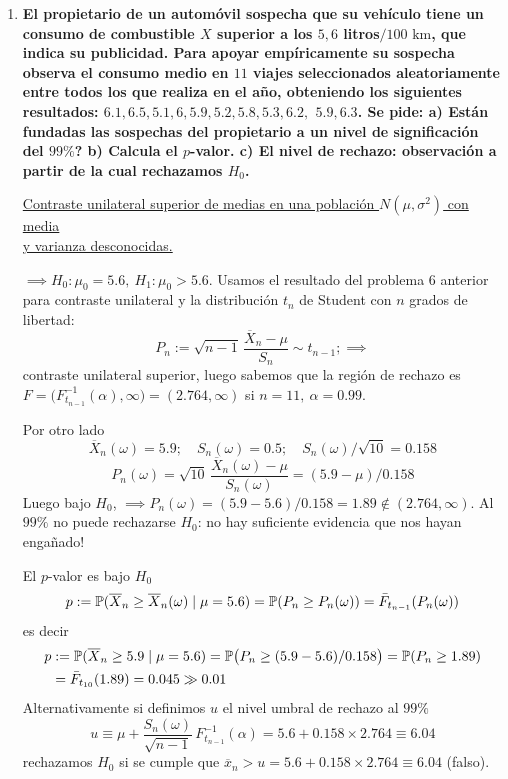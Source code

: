 \begin{enumerate}
  \item \textbf{El propietario de un automóvil sospecha que su vehículo tiene un consumo de combustible $X$ superior a los $5{,}6$ litros$/100\text{ km}$, que indica su publicidad. Para apoyar empíricamente su sospecha observa el consumo medio en $11$ viajes seleccionados aleatoriamente entre todos los que realiza en el año, obteniendo los siguientes resultados: $6.1, 6.5, 5.1, 6, 5.9, 5.2, 5.8, 5.3, 6.2,$ $5.9, 6.3$. Se pide: a) Están fundadas las sospechas del propietario a un nivel de significación del $99\%$? b) Calcula el $p$-valor. c) El nivel de rechazo: observación a partir de la cual rechazamos $H_0$.}

  \noindent\underline{Contraste unilateral superior de medias en una población $N(\mu, \sigma^2)$ con media}\\
  \underline{y varianza desconocidas.}

  $\implies H_0 : \mu_0 = 5.6,\ H_1 : \mu_0 > 5.6$. Usamos el resultado del problema $6$ anterior para contraste unilateral y la distribución $t_n$ de Student con $n$ grados de libertad:
  \[
    P_n := \sqrt{n-1}\,\frac{\overline{X}_n - \mu}{S_n} \sim t_{n-1}; \implies
  \]
  contraste unilateral superior, luego sabemos que la región de rechazo es $F = \bigl(F_{t_{n-1}}^{-1}(\alpha), \infty\bigr) = (2.764, \infty)$ si $n = 11,\ \alpha = 0.99$.

  Por otro lado
  \[
    \overline{X}_n(\omega) = 5.9; \quad S_n(\omega) = 0.5; \quad S_n(\omega)/\sqrt{10} = 0.158\]
    \[ P_n(\omega) = \sqrt{10}\,\frac{\overline{X}_n(\omega) - \mu}{S_n(\omega)} = (5.9 - \mu)/0.158
  \]
  Luego bajo $H_0$, $\implies P_n(\omega) = (5.9 - 5.6)/0.158 = 1.89 \notin (2.764, \infty)$.
  Al $99\%$ no puede rechazarse $H_0$: no hay suficiente evidencia que nos hayan engañado!

  El $p$-valor es bajo $H_0$
  \[
    p := \mathbb{P}(\overline{X}_n \geq \overline{X}_n(\omega) \mid \mu = 5.6) = \mathbb{P}(P_n \geq P_n(\omega)) = \bar{F}_{t_{n-1}}(P_n(\omega))
  \]
  es decir
  \begin{align*}
     p & := \mathbb{P}(\overline{X}_n \geq 5.9 \mid \mu = 5.6) = \mathbb{P}\bigl(P_n \geq (5.9 - 5.6)/0.158\bigr) = \mathbb{P}(P_n \geq 1.89) \\ & = \bar{F}_{t_{10}}(1.89) = 0.045 \gg 0.01    
  \end{align*}
Alternativamente si definimos $u$ el nivel umbral de rechazo al $99\%$
\[
  u \equiv \mu + \frac{S_n(\omega)}{\sqrt{n-1}}\,F_{t_{n-1}}^{-1}(\alpha) = 5.6 + 0.158 \times 2.764 \equiv 6.04
\]
rechazamos $H_0$ si se cumple que $\overline{x}_n > u = 5.6 + 0.158 \times 2.764 \equiv 6.04$ (falso).


\end{enumerate}
